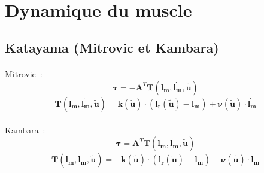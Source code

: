 \documentclass[pdftex,a4paper,11pt]{article}
\newcommand{\vs}[1]{\boldsymbol{#1}} %
\newcommand{\ms}[1]{\boldsymbol{#1}} %
\numberwithin{equation}{subsection}
\begin{document}
\begin{figure}[h]
    \centering
    ~~~
    ~~~
\end{figure}


\section{Dynamique du muscle}

\subsection{Katayama (Mitrovic et Kambara)}

\paragraph{}
Mitrovic~:
\[ \vs{\tau} = -\ms{A}^T \vs{T}(\vs{l_m}, \vs{\dot{l_m}}, \vs{\tilde{u}}) \]
\[ \vs{T}(\vs{l_m}, \vs{\dot{l_m}}, \vs{\tilde{u}}) = \vs{k}(\vs{\tilde{u}})  \cdot (\vs{l_r}(\vs{\tilde{u}}) - \vs{l_m}) + \vs{\nu}(\vs{\tilde{u}}) \cdot \vs{\dot{l_m}} \]

\paragraph{}
Kambara~:
\[ \vs{\tau} = \ms{A}^T \vs{T}(\vs{l_m}, \vs{\dot{l_m}}, \vs{\tilde{u}}) \]
\[ \vs{T}(\vs{l_m}, \vs{\dot{l_m}}, \vs{\tilde{u}}) = -\vs{k}(\vs{\tilde{u}}) \cdot (\vs{l_r}(\vs{\tilde{u}}) - \vs{l_m}) + \vs{\nu}(\vs{\tilde{u}}) \cdot \vs{\dot{l_m}} \]
\end{document}

